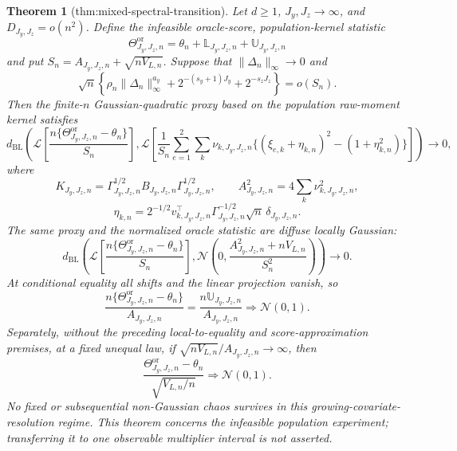 \documentclass{article}
\newtheorem{theorem}{Theorem}
\begin{document}
\begin{theorem}[thm:mixed-spectral-transition]\label{thm:mixed-spectral-transition}
Let \(d\ge1\), \(J_y,J_z\to\infty\), and \(D_{J_y,J_z}=o(n^2)\).  Define the infeasible oracle-score, population-kernel statistic
\[
\Theta^{\mathrm{or}}_{J_y,J_z,n}
=\theta_n+\mathbb L_{J_y,J_z,n}+\mathbb U_{J_y,J_z,n}
\]
and put \(S_n=A_{J_y,J_z,n}+\sqrt{nV_{L,n}}\).  Suppose that \(\|\Delta_n\|_\infty\to0\) and
\[
\sqrt n\left\{
\rho_n\|\Delta_n\|_\infty^{a_y}
+2^{-(s_y+1)J_y}+2^{-s_zJ_z}
\right\}=o(S_n).
\]
Then the finite-\(n\) Gaussian-quadratic proxy based on the population raw-moment kernel satisfies
\[
d_{\mathrm{BL}}\!\left(
\mathcal L\left[\frac{n\{\Theta^{\mathrm{or}}_{J_y,J_z,n}-\theta_n\}}{S_n}\right],
\mathcal L\left[\frac1{S_n}\sum_{e=1}^2\sum_k\nu_{k,J_y,J_z,n}
\{(\xi_{e,k}+\eta_{k,n})^2-(1+\eta_{k,n}^2)\}\right]
\right)\to0,
\]
where
\[
K_{J_y,J_z,n}=\Gamma_{J_y,J_z,n}^{1/2}B_{J_y,J_z,n}\Gamma_{J_y,J_z,n}^{1/2},
\qquad
A_{J_y,J_z,n}^2=4\sum_k\nu_{k,J_y,J_z,n}^2,
\]
\[
\eta_{k,n}=2^{-1/2}v_{k,J_y,J_z,n}^{\top}\Gamma_{J_y,J_z,n}^{-1/2}\sqrt n\,\delta_{J_y,J_z,n}.
\]
The same proxy and the normalized oracle statistic are diffuse locally Gaussian:
\[
d_{\mathrm{BL}}\!\left(
\mathcal L\left[\frac{n\{\Theta^{\mathrm{or}}_{J_y,J_z,n}-\theta_n\}}{S_n}\right],
\mathcal N\!\left(0,\frac{A_{J_y,J_z,n}^2+nV_{L,n}}{S_n^2}\right)
\right)\to0.
\]
At conditional equality all shifts and the linear projection vanish, so
\[
\frac{n\{\Theta^{\mathrm{or}}_{J_y,J_z,n}-\theta_n\}}{A_{J_y,J_z,n}}
=\frac{n\mathbb U_{J_y,J_z,n}}{A_{J_y,J_z,n}}
\Rightarrow\mathcal N(0,1).
\]
Separately, without the preceding local-to-equality and score-approximation premises, at a fixed unequal law, if \(\sqrt{nV_{L,n}}/A_{J_y,J_z,n}\to\infty\), then
\[
\frac{\Theta^{\mathrm{or}}_{J_y,J_z,n}-\theta_n}{\sqrt{V_{L,n}/n}}
\Rightarrow\mathcal N(0,1).
\]
No fixed or subsequential non-Gaussian chaos survives in this growing-covariate-resolution regime.  This theorem concerns the infeasible population experiment; transferring it to one observable multiplier interval is not asserted.
\end{theorem}
\end{document}
